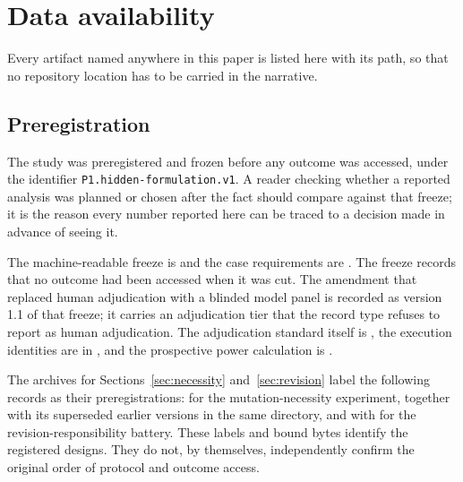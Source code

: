 \section{Data availability}
\label{sec:availability}

Every artifact named anywhere in this paper is listed here with its path, so
that no repository location has to be carried in the narrative.

\subsection{Preregistration}
The study was preregistered and frozen before any outcome was accessed, under the
identifier \texttt{P1.hidden-formulation.v1}.  A reader checking whether a
reported analysis was planned or chosen after the fact should compare against
that freeze; it is the reason every number reported here can be traced to a
decision made in advance of seeing it.

The machine-readable freeze is  and the case
requirements are . The freeze
records that no outcome had been accessed when it was cut. The amendment that
replaced human adjudication with a blinded model panel is recorded as version
1.1 of that freeze; it carries an adjudication tier that the record type refuses
to report as human adjudication. The adjudication standard itself is
, the execution identities are in
, and the prospective power calculation
is .

The archives for Sections~\ref{sec:necessity} and~\ref{sec:revision} label the
following records as their preregistrations:
for the mutation-necessity experiment, together with its superseded earlier
versions in the same directory, and
 with
 for the
revision-responsibility battery.
These labels and bound bytes identify the registered designs. They do not, by
themselves, independently confirm the original order of protocol and outcome
access.

